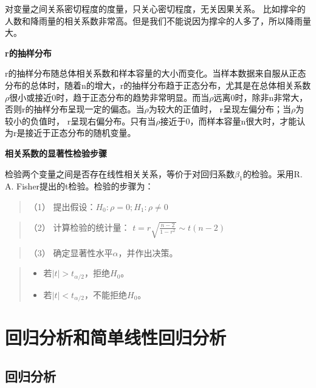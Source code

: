 \documentclass[]{ctexbook}
\providecommand{\tightlist}{%
  \setlength{\itemsep}{0pt}\setlength{\parskip}{0pt}}
\begin{document}
对变量之间关系密切程度的度量，只关心密切程度，无关因果关系。
比如撑伞的人数和降雨量的相关系数非常高。但是我们不能说因为撑伞的人多了，所以降雨量大。

\textbf{r的抽样分布}

r的抽样分布随总体相关系数和样本容量的大小而变化。当样本数据来自服从正态分布的总体时，随着n的增大，r的抽样分布趋于正态分布，尤其是在总体相关系数\(\rho\)很小或接近0时，趋于正态分布的趋势非常明显。而当\(\rho\)远离0时，除非n非常大，否则r的抽样分布呈现一定的偏态。当\(\rho\)为较大的正值时， r呈现左偏分布；当\(\rho\)为较小的负值时， r呈现右偏分布。只有当\(\rho\)接近于0，而样本容量n很大时，才能认为r是接近于正态分布的随机变量。

\textbf{相关系数的显著性检验步骤}

检验两个变量之间是否存在线性相关关系，等价于对回归系数\(\beta_1\)的检验。采用R. A. Fisher提出的t检验。检验的步骤为：

\begin{quote}
（1） 提出假设：\(H_0:\rho=0;H_1:\rho \neq0\)
\end{quote}

\begin{quote}
（2） 计算检验的统计量： \(t=r\sqrt{\frac{n-2}{1-r^2}}\sim t(n-2)\)
\end{quote}

\begin{quote}
（3） 确定显著性水平\(\alpha\)，并作出决策。
\end{quote}

\begin{quote}
\begin{itemize}
\tightlist
\item
  若\(|t|>t_{\alpha/2}\)，拒绝\(H_0\)。
\item
  若\(|t|<t_{\alpha/2}\)，不能拒绝\(H_0\)。
\end{itemize}
\end{quote}

\hypertarget{ux56deux5f52ux5206ux6790ux548cux7b80ux5355ux7ebfux6027ux56deux5f52ux5206ux6790}{%
\section{回归分析和简单线性回归分析}\label{ux56deux5f52ux5206ux6790ux548cux7b80ux5355ux7ebfux6027ux56deux5f52ux5206ux6790}}

\hypertarget{ux56deux5f52ux5206ux6790}{%
\subsection{回归分析}\label{ux56deux5f52ux5206ux6790}}
\end{document}
